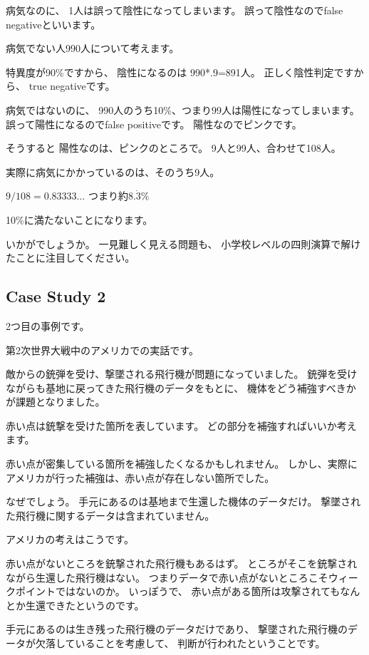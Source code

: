 \documentclass[uplatex,jis2004,dvipdfmx,12pt]{jsarticle}
\begin{document}
病気なのに、
1人は誤って陰性になってしまいます。
誤って陰性なのでfalse negativeといいます。

病気でない人990人について考えます。

特異度が90\%ですから、
陰性になるのは
990*.9=891人。
正しく陰性判定ですから、
true negativeです。

病気ではないのに、
990人のうち10\%、つまり99人は陽性になってしまいます。
誤って陽性になるのでfalse positiveです。
陽性なのでピンクです。

そうすると
陽性なのは、ピンクのところで。
9人と99人、合わせて108人。

実際に病気にかかっているのは、そのうち9人。

$9/108=0.83333\dots$
つまり約$8.\dot{3}\%$

10\%に満たないことになります。

いかがでしょうか。
一見難しく見える問題も、
小学校レベルの四則演算で解けたことに注目してください。

\subsection{Case Study 2}

2つ目の事例です。

第2次世界大戦中のアメリカでの実話です。


敵からの銃弾を受け、撃墜される飛行機が問題になっていました。
銃弾を受けながらも基地に戻ってきた飛行機のデータをもとに、
機体をどう補強すべきかが課題となりました。

赤い点は銃撃を受けた箇所を表しています。
どの部分を補強すればいいか考えます。

赤い点が密集している箇所を補強したくなるかもしれません。
しかし、実際にアメリカが行った補強は、赤い点が存在しない箇所でした。


なぜでしょう。
手元にあるのは基地まで生還した機体のデータだけ。
撃墜された飛行機に関するデータは含まれていません。

アメリカの考えはこうです。

赤い点がないところを銃撃された飛行機もあるはず。
ところがそこを銃撃されながら生還した飛行機はない。
つまりデータで赤い点がないところこそウィークポイントではないのか。
いっぽうで、
赤い点がある箇所は攻撃されてもなんとか生還できたというのです。

手元にあるのは生き残った飛行機のデータだけであり、
撃墜された飛行機のデータが欠落していることを考慮して、
判断が行われたということです。
\end{document}
